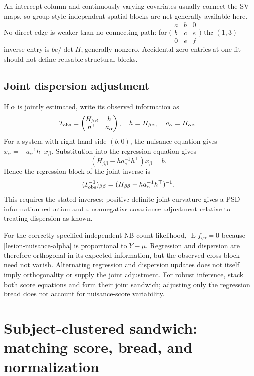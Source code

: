 \documentclass[11pt,a4paper]{article}
\newcommand{\E}{\operatorname{E}}
\numberwithin{equation}{section}
\begin{document}
An intercept column and continuously varying covariates usually
connect the SV maps, so group-style independent spatial blocks
are not generally available here.
No direct edge is weaker than no connecting path:
for $\bigl(\begin{smallmatrix}a&b&0\\b&c&e\\0&e&f\end{smallmatrix}\bigr)$
the $(1,3)$ inverse entry is $be/\det H$, generally nonzero.
Accidental zero entries at one fit should not define reusable
structural blocks.

\subsection{Joint dispersion adjustment}
If $\alpha$ is jointly estimated, write its observed information as
\[
 \mathcal I_{\rm obs}
 =\begin{pmatrix}H_{\beta\beta}&h\\h^\top&a_\alpha\end{pmatrix},
 \quad h=H_{\beta\alpha},\quad a_\alpha=H_{\alpha\alpha}.
\]
For a system with right-hand side $(b,0)$, the nuisance equation gives
$x_\alpha=-a_\alpha^{-1}h^\top x_\beta$.
Substitution into the regression equation gives
\[
 (H_{\beta\beta}-h a_\alpha^{-1}h^\top)x_\beta=b.
\]
Hence the regression block of the joint inverse is
\begin{equation}
 (\mathcal I_{\rm obs}^{-1})_{\beta\beta}
 =(H_{\beta\beta}-h a_\alpha^{-1}h^\top)^{-1}.
 \label{lesion-dispersion-schur}
\end{equation}
This requires the stated inverses; positive-definite joint curvature
gives a PSD information reduction and a nonnegative covariance
adjustment relative to treating dispersion as known.

For the correctly specified independent NB count likelihood,
$\E f_{\eta\alpha}=0$ because \eqref{lesion-nuisance-alpha}
is proportional to $Y-\mu$.
Regression and dispersion are therefore orthogonal in its
expected information, but the observed cross block need not vanish.
Alternating regression and dispersion updates does not itself imply
orthogonality or supply the joint adjustment.
For robust inference, stack both score equations and form their
joint sandwich; adjusting only the regression bread does not account
for nuisance-score variability.

\section{Subject-clustered sandwich: matching score, bread, and normalization}
\label{lesion-sandwich}
\end{document}
